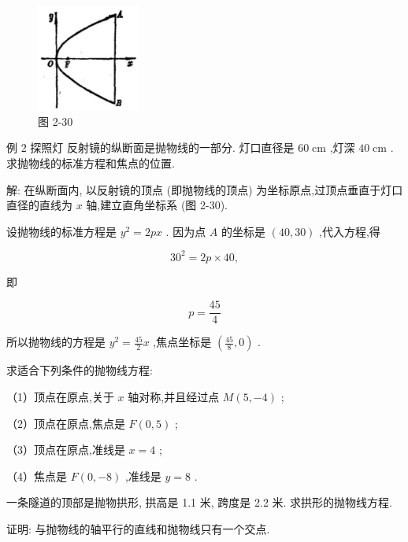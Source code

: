 \documentclass[lang=cn,newtx,10pt,scheme=chinese]{elegantbook}
\begin{document}
\begin{figure}[h]
  \centering
  \includegraphics[max width=0.3\textwidth]{images/01912cc2-ffb6-728e-9ae7-b113ff05c64b_114_351126.jpg}
  \caption{图 2-30}
\end{figure}



例 2 探照灯 反射镜的纵断面是抛物线的一部分. 灯口直径是 \({60}\mathrm{\;{cm}}\) ,灯深 \({40}\mathrm{\;{cm}}\) . 求抛物线的标准方程和焦点的位置.

解: 在纵断面内, 以反射镜的顶点 (即抛物线的顶点) 为坐标原点,过顶点垂直于灯口直径的直线为 \(x\) 轴,建立直角坐标系 (图 2-30).

设抛物线的标准方程是 \({y}^{2} = {2px}\) . 因为点 \(A\) 的坐标是 \(\left( {{40},{30}}\right)\) ,代入方程,得

\[
    {30}^{2} = {2p} \times {40},
\]

即

\[
  p = \frac{45}{4}
\]

所以抛物线的方程是 \({y}^{2} = \frac{45}{2}x\) ,焦点坐标是 \(\left( {\frac{45}{8},0}\right)\) .

\begin{problemset}[练习]

\item 求适合下列条件的抛物线方程:

（1）顶点在原点,关于 \(x\) 轴对称,并且经过点 \(M\left( {5, - 4}\right)\) ;

（2）顶点在原点,焦点是 \(F\left( {0,5}\right)\) ;

（3）顶点在原点,准线是 \(x = 4\) ;

（4）焦点是 \(F\left( {0, - 8}\right)\) ,准线是 \(y = 8\) .

\item 一条隧道的顶部是抛物拱形, 拱高是 1.1 米, 跨度是 2.2 米. 求拱形的抛物线方程.

\item 证明: 与抛物线的轴平行的直线和抛物线只有一个交点.

\end{problemset}
\end{document}
